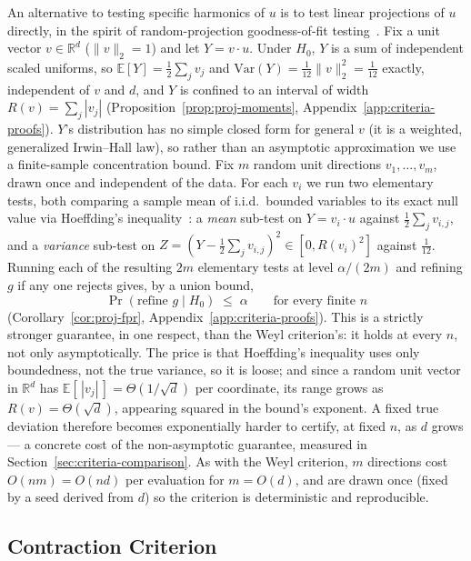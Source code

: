 \documentclass[11pt]{article}
\begin{document}
An alternative to testing specific harmonics of $u$ is to test linear projections of $u$ directly, in the spirit of random-projection goodness-of-fit testing~\cite{CuestaAlbertos2007Projections}. Fix a unit vector $v \in \mathbb{R}^d$ ($\|v\|_2=1$) and let $Y = v \cdot u$. Under $H_0$, $Y$ is a sum of independent scaled uniforms, so $\mathbb{E}[Y] = \tfrac12\sum_j v_j$ and $\mathrm{Var}(Y) = \tfrac{1}{12}\|v\|_2^2 = \tfrac{1}{12}$ exactly, independent of $v$ and $d$, and $Y$ is confined to an interval of width $R(v) = \sum_j |v_j|$ (Proposition~\ref{prop:proj-moments}, Appendix~\ref{app:criteria-proofs}). $Y$'s distribution has no simple closed form for general $v$ (it is a weighted, generalized Irwin--Hall law), so rather than an asymptotic approximation we use a finite-sample concentration bound. Fix $m$ random unit directions $v_1,\ldots,v_m$, drawn once and independent of the data. For each $v_i$ we run two elementary tests, both comparing a sample mean of i.i.d.\ bounded variables to its exact null value via Hoeffding's inequality~\cite{Hoeffding1963}: a \emph{mean} sub-test on $Y = v_i \cdot u$ against $\tfrac12\sum_j v_{i,j}$, and a \emph{variance} sub-test on $Z = (Y - \tfrac12\sum_j v_{i,j})^2 \in [0, R(v_i)^2]$ against $\tfrac{1}{12}$. Running each of the resulting $2m$ elementary tests at level $\alpha/(2m)$ and refining $g$ if any one rejects gives, by a union bound,
\[
\Pr(\text{refine } g \mid H_0) \;\leq\; \alpha \qquad \text{for every finite } n
\]
(Corollary~\ref{cor:proj-fpr}, Appendix~\ref{app:criteria-proofs}). This is a strictly stronger guarantee, in one respect, than the Weyl criterion's: it holds at every $n$, not only asymptotically. The price is that Hoeffding's inequality uses only boundedness, not the true variance, so it is loose; and since a random unit vector in $\mathbb{R}^d$ has $\mathbb{E}[\,|v_j|\,] = \Theta(1/\sqrt{d})$ per coordinate, its range grows as $R(v) = \Theta(\sqrt{d})$, appearing squared in the bound's exponent. A fixed true deviation therefore becomes exponentially harder to certify, at fixed $n$, as $d$ grows — a concrete cost of the non-asymptotic guarantee, measured in Section~\ref{sec:criteria-comparison}. As with the Weyl criterion, $m$ directions cost $O(nm)=O(nd)$ per evaluation for $m = O(d)$, and are drawn once (fixed by a seed derived from $d$) so the criterion is deterministic and reproducible.

\subsection{Contraction Criterion}
\end{document}
